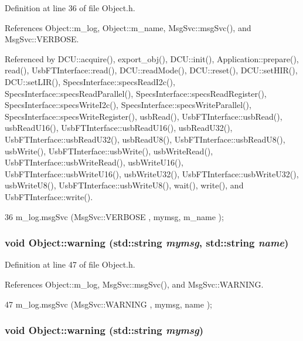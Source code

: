 Definition at line 36 of file Object.h.

References Object::m\_\-log, Object::m\_\-name, MsgSvc::msgSvc(), and MsgSvc::VERBOSE.

Referenced by DCU::acquire(), export\_\-obj(), DCU::init(), Application::prepare(), read(), UsbFTInterface::read(), DCU::readMode(), DCU::reset(), DCU::setHIR(), DCU::setLIR(), SpecsInterface::specsReadI2c(), SpecsInterface::specsReadParallel(), SpecsInterface::specsReadRegister(), SpecsInterface::specsWriteI2c(), SpecsInterface::specsWriteParallel(), SpecsInterface::specsWriteRegister(), usbRead(), UsbFTInterface::usbRead(), usbReadU16(), UsbFTInterface::usbReadU16(), usbReadU32(), UsbFTInterface::usbReadU32(), usbReadU8(), UsbFTInterface::usbReadU8(), usbWrite(), UsbFTInterface::usbWrite(), usbWriteRead(), UsbFTInterface::usbWriteRead(), usbWriteU16(), UsbFTInterface::usbWriteU16(), usbWriteU32(), UsbFTInterface::usbWriteU32(), usbWriteU8(), UsbFTInterface::usbWriteU8(), wait(), write(), and UsbFTInterface::write().


\begin{DoxyCode}
36 { m_log.msgSvc (MsgSvc::VERBOSE , mymsg, m_name ); }
\end{DoxyCode}
\hypertarget{classObject_a11f101db4dd73d9391b0231818881d86}{
\subsubsection[{warning}]{\setlength{\rightskip}{0pt plus 5cm}void Object::warning (std::string {\em mymsg}, \/  std::string {\em name})}}
\label{classObject_a11f101db4dd73d9391b0231818881d86}


Definition at line 47 of file Object.h.

References Object::m\_\-log, MsgSvc::msgSvc(), and MsgSvc::WARNING.


\begin{DoxyCode}
47 { m_log.msgSvc (MsgSvc::WARNING , mymsg, name ); }
\end{DoxyCode}
\hypertarget{classObject_a65cd4fda577711660821fd2cd5a3b4c9}{
\subsubsection[{warning}]{\setlength{\rightskip}{0pt plus 5cm}void Object::warning (std::string {\em mymsg})}}
\label{classObject_a65cd4fda577711660821fd2cd5a3b4c9}


